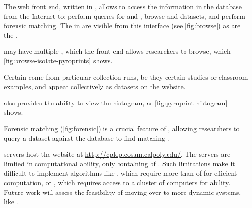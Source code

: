 The web front end, written in \php{}, allows \cplop{} to access the information in the database from the Internet to: perform queries for \isols{} and \pyros{}, browse \isol{} and \pyro{} datasets, and perform forensic matching. 
The \isols{} in \cplop{} are visible from this interface (see \autoref{fig:browse}) as are the \pyros{}.

\Isols{} may have multiple \pyros{}, which the \cplop{} front end allows researchers to browse, which \autoref{fig:browse-isolate-pyroprints} shows.

Certain \isols{} come from particular collection runs, be they certain studies or classroom examples, and appear collectively as datasets on the website.

\cplop{} also provides the ability to view the \pyro{} histogram, as \autoref{fig:pyroprint-histogram} shows.

Forensic matching (\autoref{fig:forensic}) is a crucial feature of \cplop{}, allowing researchers to query a dataset against the \cplop{} database to find matching \isols{}.


\cp{} servers host the \cplop{} website at \url{http://cplop.cosam.calpoly.edu/}.
The servers are limited in computational ability, only containing  of \ram{}.
Such limitations make it difficult to implement algorithms like \ohclust{} \cite{montana2013algorithms, montana2013ontological, montana2012investigating}, which require more than  of \ram{} for efficient computation, or \cite{adams2016using}, which requires access to a cluster of computers for \mapreduce{} ability.
Future work will assess the feasibility of moving over to more dynamic systems, like \awslong{}.

